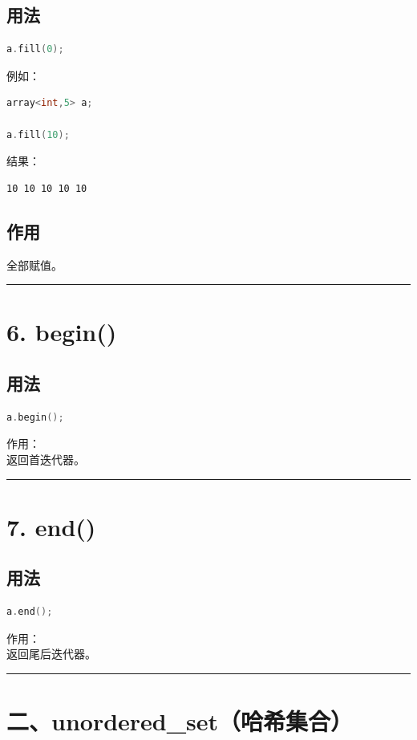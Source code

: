\documentclass[9pt,twocolumn]{extarticle}
\begin{document}
\subsection{用法}
\begin{lstlisting}[language=C++]
a.fill(0);
\end{lstlisting}
例如：
\begin{lstlisting}[language=C++]
array<int,5> a;

a.fill(10);
\end{lstlisting}
结果：
\begin{lstlisting}
10 10 10 10 10
\end{lstlisting}

\subsection{作用}
全部赋值。

\noindent\rule{\linewidth}{0.4pt}

\section{6. begin()}

\subsection{用法}
\begin{lstlisting}[language=C++]
a.begin();
\end{lstlisting}
作用：\\
返回首迭代器。

\noindent\rule{\linewidth}{0.4pt}

\section{7. end()}

\subsection{用法}
\begin{lstlisting}[language=C++]
a.end();
\end{lstlisting}
作用：\\
返回尾后迭代器。

\noindent\rule{\linewidth}{0.4pt}

\section{二、unordered\_set（哈希集合）}
\end{document}
